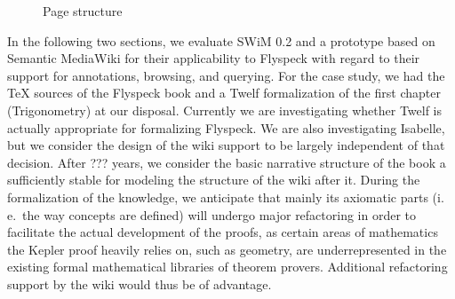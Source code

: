 \documentclass{llncs}
\begin{document}
\newcommand{\wikipage}[5]{\node[draw,text width=5cm,font=\tiny\sffamily] (#1) at #2 {
    {\footnotesize\bfseries #3}\\
    #4
    ~\\[1em]
    [Download Isabelle representation]\\
    #5
  };}
\begin{figure}
  \centering
  \caption{Page structure}
  \label{fig:pagestructure}
\end{figure}

In the following two sections, we evaluate SWiM 0.2 and a prototype based on Semantic
MediaWiki for their applicability to Flyspeck with regard to their support for
annotations, browsing, and querying.  For the case study, we had the {\TeX} sources of the
Flyspeck book and a Twelf formalization of the first chapter (Trigonometry) at our
disposal.  Currently we are
investigating whether Twelf is actually appropriate for formalizing Flyspeck.  We are also
investigating Isabelle, but we consider the design of the wiki support to be largely
independent of that decision.  After ??? years, we consider
the basic narrative structure of the book a sufficiently stable for modeling the structure
of the wiki after it.  During the formalization of the knowledge, we anticipate that
mainly its axiomatic parts (i.\,e.\ the way concepts are defined) will undergo major
refactoring in order to facilitate the actual development of the proofs, as certain areas
of mathematics the Kepler proof heavily relies on, such as geometry, are underrepresented
in the existing formal mathematical libraries of theorem provers.  Additional refactoring
support by the wiki would thus be of advantage.
\end{document}

